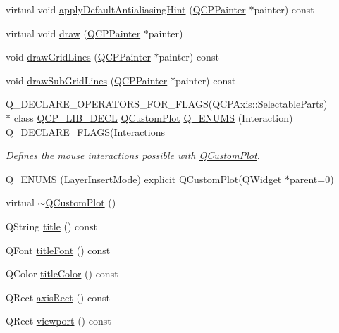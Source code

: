 \begin{DoxyCompactItemize}
\item 
virtual void \hyperlink{a00116_a04062908d31c258aea6a7f9760c8431b}{apply\+Default\+Antialiasing\+Hint} (\hyperlink{a00047}{Q\+C\+P\+Painter} $\ast$painter) const 
\item 
virtual void \hyperlink{a00116_a2e9b3d14dffa43c79835869d488936c9}{draw} (\hyperlink{a00047}{Q\+C\+P\+Painter} $\ast$painter)
\item 
void \hyperlink{a00116_a3aff10e993f6625e255c19e4f97a09d8}{draw\+Grid\+Lines} (\hyperlink{a00047}{Q\+C\+P\+Painter} $\ast$painter) const 
\item 
void \hyperlink{a00116_afa5d9d12de419e881f381f2ab7cb414d}{draw\+Sub\+Grid\+Lines} (\hyperlink{a00047}{Q\+C\+P\+Painter} $\ast$painter) const 
\item 
Q\+\_\+\+D\+E\+C\+L\+A\+R\+E\+\_\+\+O\+P\+E\+R\+A\+T\+O\+R\+S\+\_\+\+F\+O\+R\+\_\+\+F\+L\+A\+G\+S(Q\+C\+P\+Axis\+::\+Selectable\+Parts) \\*
class \hyperlink{a00116_a5eaab02224a642ded7fb8951e973a02c}{Q\+C\+P\+\_\+\+L\+I\+B\+\_\+\+D\+E\+C\+L} \hyperlink{a00030_d8/d00/a00186}{Q\+Custom\+Plot} \hyperlink{a00116_a1d38a82e53419cba42b10c7d8e5207db}{Q\+\_\+\+E\+N\+U\+M\+S} (Interaction) Q\+\_\+\+D\+E\+C\+L\+A\+R\+E\+\_\+\+F\+L\+A\+G\+S(Interactions
\begin{DoxyCompactList}\small\item\em Defines the mouse interactions possible with \hyperlink{a00030_d8/d00/a00186}{Q\+Custom\+Plot}. \end{DoxyCompactList}\item 
\hyperlink{a00116_aa93e3a46948bc8143cd97bf88340fe5e}{Q\+\_\+\+E\+N\+U\+M\+S} (\hyperlink{a00116_acf68ae22e9b44e959fc82bc6366e9b8d}{Layer\+Insert\+Mode}) explicit \hyperlink{a00030_d8/d00/a00186}{Q\+Custom\+Plot}(Q\+Widget $\ast$parent=0)
\item 
virtual \hyperlink{a00116_a75d9b6f599dcae706e45efd425c5499e}{$\sim$\+Q\+Custom\+Plot} ()
\item 
Q\+String \hyperlink{a00116_aec7f0fb0be1d3a0a946f0ded3a860d20}{title} () const 
\item 
Q\+Font \hyperlink{a00116_a8eeb368f46dc1c0522cfaaa8fac11884}{title\+Font} () const 
\item 
Q\+Color \hyperlink{a00116_aaa8ddce62f18c4f935b54427f0a61459}{title\+Color} () const 
\item 
Q\+Rect \hyperlink{a00116_ad1541f59ff23332e3245b74af2fd3833}{axis\+Rect} () const 
\item 
Q\+Rect \hyperlink{a00116_a953ecdbc28018e7e84cb6213ad3d88c2}{viewport} () const 

\end{DoxyCompactItemize}
